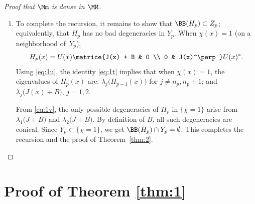 \begin{proof}[Proof that $\Mm$ is dense in $\MM$]
\begin{enumerate}
The recursion assumption $d(H,H_{p-1}) \leq (1-2^{-p-1}) \epsi$ and $d(H_p,H_{p-1}) \leq 2^{-p} \epsi$ yield $d(H, H_p) \leq \bigl(1-2^{-p}\bigr) \epsi$. Moreover, $d(H_p,H_{p-1}) \leq \eta_0/8$ implies $\| H_p - H_{p-1} \|_{C^2} \leq \eta_0$. From Lemma \ref{lem:1c} and the recursion assumption $\BB(H_{p-1}) \subset Z_{p-1}$, $\BB(H_p) \subset Z_{p-1}$.

\item
To complete the recursion, it remains to show that $\BB(H_p) \subset Z_p$; equivalently, that $H_p$ has no bad degeneracies in $Y_p$. When $\chi(x) = 1$ (\ie on a neighborhood of~$Y_p$),
\begin{equation}\label{eq:1t}
H_p(x) = U(x) \matrice{J(x) + B & 0 \\ 0 & J(x)^\perp}U(x)^*.
\end{equation}
Using \eqref{eq:1u}, the identity \eqref{eq:1t} implies that when $\chi(x)=1$, the eigenvalues of $H_p(x)$ are: $\lambda_j\bigl( H_{p-1}(x) \bigr)$ for $j \neq n_p, n_p+1$; and $\lambda_j\bigl( J(x) + B \bigr)$, $j =1,2$.

From \eqref{eq:1v}, the only possible degeneracies of $H_p$ in $\{ \chi = 1 \}$ arise from $\lambda_1\bigl( J + B \bigr)$ and $\lambda_2\bigl( J + B \bigr)$. By definition of $B$, all such degeneracies are conical. Since $Y_p \subset \{ \chi=1\}$, we get $\BB(H_p) \cap Y_p = \emptyset$. This completes the recursion and the proof of Theorem~\ref{thm:2}.\qedhere
\end{enumerate}
\end{proof}

\section{Proof of Theorem \ref{thm:1}}\label{sec:4}

